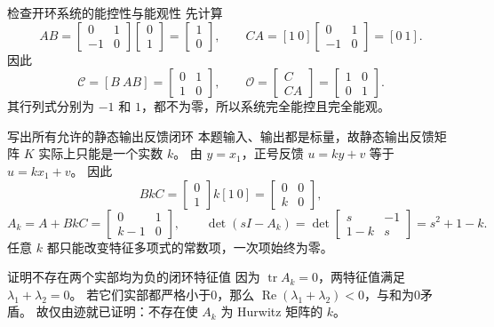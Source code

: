 \documentclass[11pt]{article}
\begin{document}
\begin{solution}
\begin{proofstep}{检查开环系统的能控性与能观性}
先计算
\[
AB=\begin{bmatrix}0&1\\-1&0\end{bmatrix}\begin{bmatrix}0\\1\end{bmatrix}
=\begin{bmatrix}1\\0\end{bmatrix},\qquad
CA=[1\ 0]\begin{bmatrix}0&1\\-1&0\end{bmatrix}=[0\ 1].
\]
因此
\[
\mathcal C=[B\ AB]=\begin{bmatrix}0&1\\1&0\end{bmatrix},\qquad
\mathcal O=\begin{bmatrix}C\\CA\end{bmatrix}
=\begin{bmatrix}1&0\\0&1\end{bmatrix}.
\]
其行列式分别为 $-1$ 和 $1$，都不为零，所以系统完全能控且完全能观。
\end{proofstep}

\begin{proofstep}{写出所有允许的静态输出反馈闭环}
本题输入、输出都是标量，故静态输出反馈矩阵 $K$ 实际上只能是一个实数 $k$。
由 $y=x_1$，正号反馈 $u=ky+v$ 等于 $u=kx_1+v$。
因此
\[
BkC=\begin{bmatrix}0\\1\end{bmatrix}k[1\ 0]
=\begin{bmatrix}0&0\\k&0\end{bmatrix},
\]
\[
A_k=A+BkC=\begin{bmatrix}0&1\\k-1&0\end{bmatrix},\qquad
\det(sI-A_k)=\det\begin{bmatrix}s&-1\\1-k&s\end{bmatrix}=s^2+1-k.
\]
任意 $k$ 都只能改变特征多项式的常数项，一次项始终为零。
\end{proofstep}

\begin{proofstep}{证明不存在两个实部均为负的闭环特征值}
因为 $\operatorname{tr}A_k=0$，两特征值满足 $\lambda_1+\lambda_2=0$。
若它们实部都严格小于0，那么
$\operatorname{Re}(\lambda_1+\lambda_2)<0$，与和为0矛盾。
故仅由迹就已证明：不存在使 $A_k$ 为 Hurwitz 矩阵的 $k$。


\end{proofstep}
\end{solution}
\end{document}

